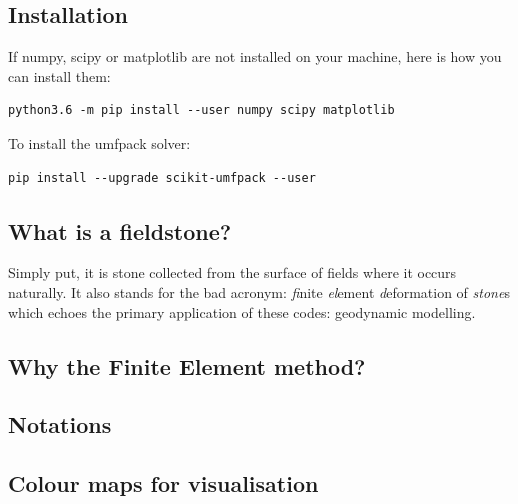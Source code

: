 \documentclass[a4paper]{article}
\begin{document}
\subsection{Installation} %

If numpy, scipy or matplotlib are not installed on your machine, here is how you 
can install them:
\begin{verbatim}
python3.6 -m pip install --user numpy scipy matplotlib
\end{verbatim}
To install the umfpack solver:
\begin{verbatim}
pip install --upgrade scikit-umfpack --user
\end{verbatim}


\subsection{What is a fieldstone?} %
Simply put, it is stone collected from the surface of fields where it 
occurs naturally. It also stands for the bad acronym: {\sl fi}nite 
{\sl el}ement {\sl d}eformation of {\sl stone}s which echoes the primary 
application of these codes: geodynamic modelling.

\subsection{Why the Finite Element method?}  %
\subsection{Notations}  %
\subsection{Colour maps for visualisation}  %


\newpage
\end{document}

